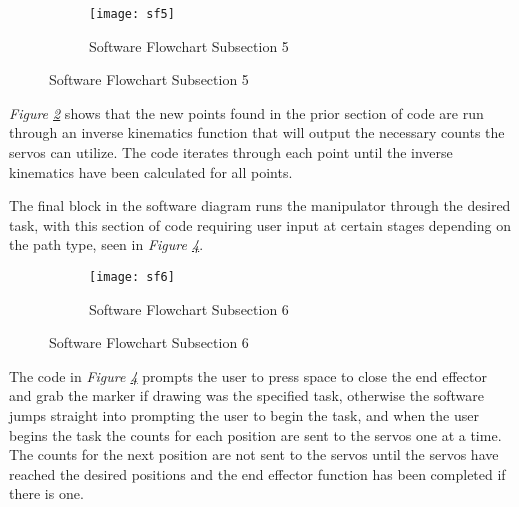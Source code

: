 \begin{figure}[htp] \ContinuedFloat
  \begin{subfigure}[c]{\textwidth}
  \center
  \texttt{[image: sf5]}
  \caption{Software Flowchart Subsection 5}
  \label{fig:sf5}
  \end{subfigure}
\end{figure}

\emph{Figure \ref{fig:sf5}} shows that the new points found in the prior section of code are run through an inverse kinematics function that will output the necessary counts the servos can utilize. The code iterates through each point until the inverse kinematics have been calculated for all points.

The final block in the software diagram runs the manipulator through the desired task, with this section of code requiring user input at certain stages depending on the path type, seen in \emph{Figure \ref{fig:sf6}}.
\begin{figure}[htp] \ContinuedFloat
  \begin{subfigure}[c]{\textwidth}
  \center
  \texttt{[image: sf6]}
  \caption{Software Flowchart Subsection 6}
  \label{fig:sf6}
  \end{subfigure}
\end{figure}

The code in \emph{Figure \ref{fig:sf6}} prompts the user to press space to close the end effector and grab the marker if drawing was the specified task, otherwise the software jumps straight into prompting the user to begin the task, and when the user begins the task the counts for each position are sent to the servos one at a time. The counts for the next position are not sent to the servos until the servos have reached the desired positions and the end effector function has been completed if there is one.
